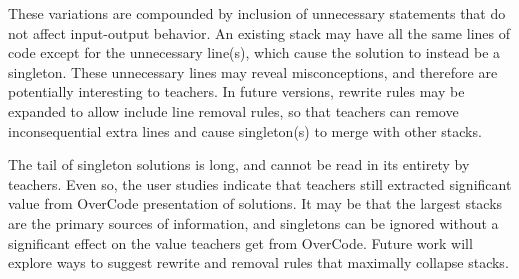 These variations are compounded by inclusion of unnecessary statements that do not affect input-output behavior. An existing stack may have all the same lines of code except for the unnecessary line(s), which cause the solution to instead be a singleton. These unnecessary lines may reveal misconceptions, and therefore are potentially interesting to teachers. In future versions, rewrite rules may be expanded to allow include line removal rules, so that teachers can remove inconsequential extra lines and cause singleton(s) to merge with other stacks. 

The tail of singleton solutions is long, and cannot be read in its entirety by teachers. Even so, the user studies indicate that teachers still extracted significant value from OverCode presentation of solutions. It may be that the largest stacks are the primary sources of information, and singletons can be ignored without a significant effect on the value teachers get from OverCode. Future work will explore ways to suggest rewrite and removal rules that maximally collapse stacks.

